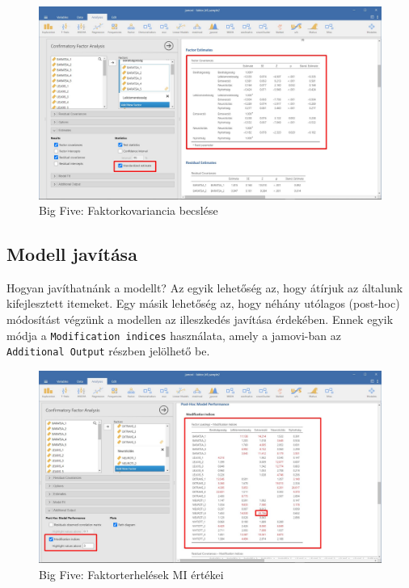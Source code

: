 \documentclass[
  letterpaper,
]{krantz}
\begin{document}
\begin{figure}

{\centering \includegraphics{./images/cfa_kep_04.jpg}

}

\caption{Big Five: Faktorkovariancia becslése}

\end{figure}

\hypertarget{modell-javuxedtuxe1sa}{%
\subsection{Modell javítása}\label{modell-javuxedtuxe1sa}}

Hogyan javíthatnánk a modellt? Az egyik lehetőség az, hogy átírjuk az
általunk kifejlesztett itemeket. Egy másik lehetőség az, hogy néhány
utólagos (post-hoc) módosítást végzünk a modellen az illeszkedés
javítása érdekében. Ennek egyik módja a \texttt{Modification\ indices}
használata, amely a jamovi-ban az \texttt{Additional\ Output} részben
jelölhető be.

\begin{figure}

{\centering \includegraphics{./images/cfa_kep_05.jpg}

}

\caption{Big Five: Faktorterhelések MI értékei}

\end{figure}
\end{document}
